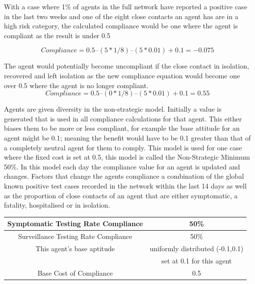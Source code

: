 \documentclass{article}
\begin{document}
With a case where 1\% of agents in the full network have reported a positive case in the last two weeks and one of the eight close contacts an agent has are in a high risk category, the calculated compliance would be one where the agent is compliant as the result is under 0.5

\[Compliance = 0.5 – (5 * 1/8) – (5*0.01) + 0.1 = -0.075\]


The agent would potentially become uncompliant if the close contact in isolation, recovered and left isolation as the new compliance equation would become one over 0.5 where the agent is no longer compliant.
\[Compliance = 0.5 – (0 * 1/8) – (5*0.01) + 0.1 = 0.55\]



Agents are given diversity in the non-strategic model. Initially a value is generated that is used in all compliance calculations for that agent. This either biases them to be more or less compliant, for example the base attitude for an agent might be 0.1; meaning the benefit would have to be 0.1 greater than that of a completely neutral agent for them to comply. This model is used for one case where the fixed cost is set at 0.5, this model is called the Non-Strategic Minimum 50\%.  In this model each day the compliance value for an agent is updated and changes. Factors that change the agents compliance a combination of the global known positive test cases recorded in the network within the last 14 days as well as the proportion of close contacts of an agent that are either symptomatic, a fatality, hospitalised or in isolation.\newline



\begin{tabular}{|c|c|}
\hline
Symptomatic Testing Rate Compliance & 50\% \\ \hline
Surveillance Testing Rate Compliance & 50\% \\ \hline
This agent’s base aptitude & uniformly distributed (-0.1,0.1) \\ 
&  set at 0.1 for this agent\\ \hline
Base Cost of Compliance & 0.5 \\ \hline
\end{tabular}
\newline


\newpage
\end{document}
